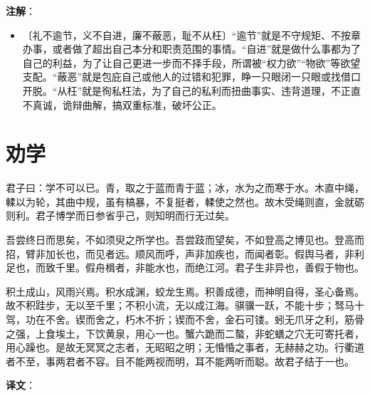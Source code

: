\documentclass[12pt,UTF-8,openany]{ctexbook}
\begin{document}
\newpage

\textbf{注解}：

\vspace{-1em}

\begin{itemize}
    \setlength\itemsep{-0.2em}
    \item〔礼不逾节，义不自进，廉不蔽恶，耻不从枉〕“逾节”就是不守规矩、不按章办事，或者做了超出自己本分和职责范围的事情。“自进”就是做什么事都为了自己的利益，为了让自己更进一步而不择手段，所谓被“权力欲”“物欲”等欲望支配。“蔽恶”就是包庇自己或他人的过错和犯罪，睁一只眼闭一只眼或找借口开脱。“从枉”就是徇私枉法，为了自己的私利而扭曲事实、违背道理，不正直不真诚，诡辩曲解，搞双重标准，破坏公正。
\end{itemize}

\chapter{劝学}

\begin{normalsize}
    
    君子曰：学不可以已。青，取之于蓝而青于蓝；冰，水为之而寒于水。木直中绳，輮以为轮，其曲中规，虽有槁暴，不复挺者，輮使之然也。故木受绳则直，金就砺则利。君子博学而日参省乎己，则知明而行无过矣。
    
    吾尝终日而思矣，不如须臾之所学也。吾尝跂而望矣，不如登高之博见也。登高而招，臂非加长也，而见者远。顺风而呼，声非加疾也，而闻者彰。假舆马者，非利足也，而致千里。假舟楫者，非能水也，而绝江河。君子生非异也，善假于物也。
    
    积土成山，风雨兴焉。积水成渊，蛟龙生焉。积善成德，而神明自得，圣心备焉。故不积跬步，无以至千里；不积小流，无以成江海。骐骥一跃，不能十步；驽马十驾，功在不舍。锲而舍之，朽木不折；锲而不舍，金石可镂。蚓无爪牙之利，筋骨之强，上食埃土，下饮黄泉，用心一也。蟹六跪而二螯，非蛇蟮之穴无可寄托者，用心躁也。是故无冥冥之志者，无昭昭之明；无惛惛之事者，无赫赫之功。行衢道者不至，事两君者不容。目不能两视而明，耳不能两听而聪。故君子结于一也。
\end{normalsize}


\newpage

\textbf{译文}：

\vspace{1em}
\end{document}
